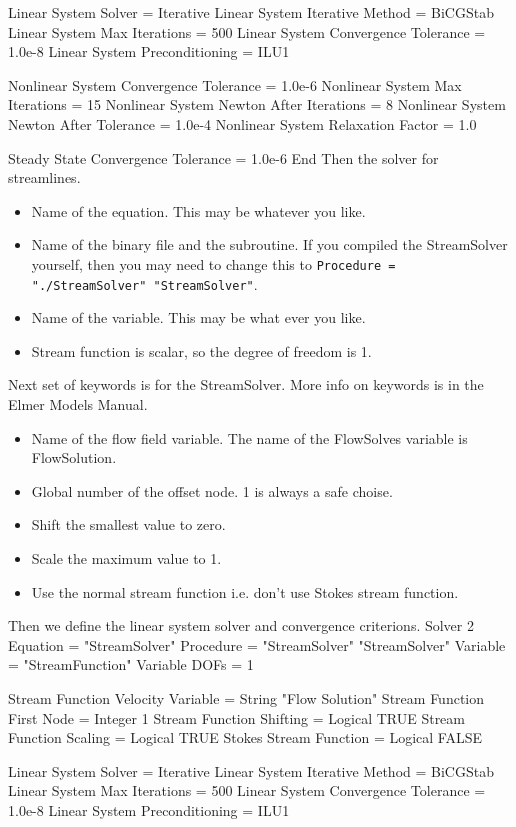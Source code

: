   Linear System Solver = Iterative
  Linear System Iterative Method = BiCGStab
  Linear System Max Iterations = 500
  Linear System Convergence Tolerance = 1.0e-8
  Linear System Preconditioning = ILU1

  Nonlinear System Convergence Tolerance = 1.0e-6
  Nonlinear System Max Iterations = 15
  Nonlinear System Newton After Iterations = 8
  Nonlinear System Newton After Tolerance = 1.0e-4
  Nonlinear System Relaxation Factor = 1.0

  Steady State Convergence Tolerance = 1.0e-6
End
\ttend
Then the solver for streamlines.
\begin{itemize}
\item Name of the equation. This may be whatever you like.
\item Name of the binary file and the subroutine. If you compiled the StreamSolver yourself,
then you may need to change this to \texttt{Procedure = "./StreamSolver" "StreamSolver"}.
\item Name of the variable. This may be what ever you like.
\item Stream function is scalar, so the degree of freedom is 1.
\end{itemize}
Next set of keywords is for the StreamSolver. More info on keywords is in the Elmer
Models Manual.
\begin{itemize}
\item Name of the flow field variable. The name of the FlowSolves variable is FlowSolution.
\item Global number of the offset node. 1 is always a safe choise.
\item Shift the smallest value to zero.
\item Scale the maximum value to 1.
\item Use the normal stream function i.e. don't use Stokes stream function.
\end{itemize}
Then we define the linear system solver and convergence criterions.
\ttbegin
Solver 2
  Equation = "StreamSolver"
  Procedure = "StreamSolver" "StreamSolver"
  Variable = "StreamFunction"
  Variable DOFs = 1

  Stream Function Velocity Variable = String "Flow Solution"
  Stream Function First Node = Integer 1
  Stream Function Shifting = Logical TRUE
  Stream Function Scaling = Logical TRUE
  Stokes Stream Function = Logical FALSE

  Linear System Solver = Iterative
  Linear System Iterative Method = BiCGStab
  Linear System Max Iterations = 500
  Linear System Convergence Tolerance = 1.0e-8
  Linear System Preconditioning = ILU1

